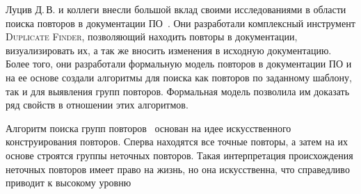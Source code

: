 

Луцив Д.\,В. и коллеги внесли большой вклад своими исследованиями в области поиска повторов в документации ПО~\cite{luciv2018detecting,luciv2018duplicate,luciv2019interactive,koznov2015clone,koznov2017duplicate,luciv2016fuzzy}. 
Они разработали комплексный инструмент \textsc{Duplicate Finder}, позволяющий находить повторы в документации, визуализировать их, а так же вносить изменения в исходную документацию.
Более того, они разработали формальную модель повторов в документации ПО и на ее основе создали алгоритмы для поиска как повторов по заданному шаблону, так и для выявления групп повторов.
Формальная модель позволила им доказать ряд свойств в отношении этих алгоритмов.

Алгоритм поиска групп повторов~\cite{luciv2016fuzzy} основан на  идее искусственного конструирования повторов.
Сперва находятся все точные повторы, а затем на их основе строятся группы неточных повторов.
Такая интерпретация происхождения неточных повторов имеет право на жизнь, но она искусственна, что справедливо приводит к высокому уровню 


